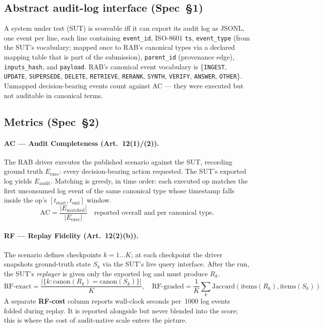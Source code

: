 \documentclass[11pt,a4paper]{article}
\begin{document}
\subsection{Abstract audit-log interface (Spec~§1)}
A system under test (SUT) is scoreable iff it can export its audit log as JSONL, one event per line, each line containing \texttt{event\_id}, ISO-8601 \texttt{ts}, \texttt{event\_type} (from the SUT's vocabulary; mapped once to RAB's canonical types via a declared mapping table that is part of the submission), \texttt{parent\_id} (provenance edge), \texttt{inputs\_hash}, and \texttt{payload}. RAB's canonical event vocabulary is \{\texttt{INGEST}, \texttt{UPDATE}, \texttt{SUPERSEDE}, \texttt{DELETE}, \texttt{RETRIEVE}, \texttt{RERANK}, \texttt{SYNTH}, \texttt{VERIFY}, \texttt{ANSWER}, \texttt{OTHER}\}. Unmapped decision-bearing events count against AC --- they were executed but not auditable in canonical terms.

\subsection{Metrics (Spec~§2)}

\paragraph{AC --- Audit Completeness (Art.~12(1)/(2)).} The RAB driver executes the published scenario against the SUT, recording ground truth $E_{\mathrm{exec}}$: every decision-bearing action requested. The SUT's exported log yields $E_{\mathrm{audit}}$. Matching is greedy, in time order: each executed op matches the first unconsumed log event of the same canonical type whose timestamp falls inside the op's $[t_{\mathrm{start}}, t_{\mathrm{end}}]$ window.
\[\mathrm{AC} = \frac{|E_{\mathrm{matched}}|}{|E_{\mathrm{exec}}|}\quad \text{reported overall and per canonical type.}\]

\paragraph{RF --- Replay Fidelity (Art.~12(2)(b)).} The scenario defines checkpoints $k = 1\ldots K$; at each checkpoint the driver snapshots ground-truth state $S_k$ via the SUT's live query interface. After the run, the SUT's \emph{replayer} is given only the exported log and must produce $R_k$.
\[
\mathrm{RF\text{-}exact} = \frac{|\{k : \mathrm{canon}(R_k) = \mathrm{canon}(S_k)\}|}{K}, \quad
\mathrm{RF\text{-}graded} = \frac{1}{K} \sum_k \mathrm{Jaccard}(\mathrm{items}(R_k), \mathrm{items}(S_k))
\]
A separate \textbf{RF-cost} column reports wall-clock seconds per~1000 log events folded during replay. It is reported alongside but never blended into the score; this is where the cost of audit-native scale enters the picture.
\end{document}
